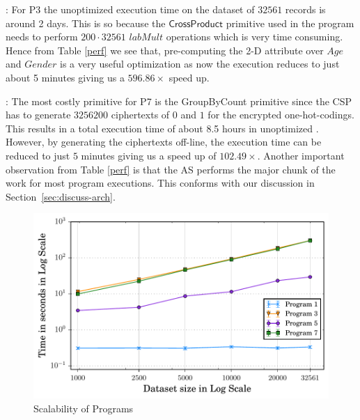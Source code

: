: For P3 the unoptimized execution time on the dataset of $32561$ records is around 2 days. This is so because the $\textsf{CrossProduct}$ primitive used in the program needs to perform $200\cdot 32561$ $labMult$ operations which is very time consuming. Hence from Table \ref{perf} we see that, pre-computing the 2-D attribute over $Age$ and $Gender$ is a very useful optimization as now the execution reduces to just about 5 minutes giving us a $596.86\times$ speed up.  %

:
The most costly primitive for P7 is the \textsf{GroupByCount} primitive since the \textsf{CSP} has to generate $3256200$ ciphertexts of $0$ and $1$ for the encrypted one-hot-codings. This results in a  total execution time of about 8.5 hours in unoptimized \system. However, by generating the ciphertexts off-line, the execution time can be reduced to just $5$ minutes giving us a speed up of $102.49\times$.
Another important observation from Table \ref{perf} is that the \textsf{AS} performs the major chunk of the work for most program executions. This conforms with our discussion in Section~\ref{sec:discuss-arch}.

\begin{figure}[ht]
      \includegraphics[width=0.5\linewidth]{scale_finals.pdf}
        \caption{Scalability of \system Programs }\label{scale}
    \end{figure}

